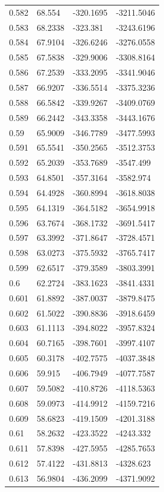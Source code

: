 \begin{tabular}{llll}
0.582 & 68.554 & -320.1695 & -3211.5046 \\
0.583 & 68.2338 & -323.381 & -3243.6196 \\
0.584 & 67.9104 & -326.6246 & -3276.0558 \\
0.585 & 67.5838 & -329.9006 & -3308.8164 \\
0.586 & 67.2539 & -333.2095 & -3341.9046 \\
0.587 & 66.9207 & -336.5514 & -3375.3236 \\
0.588 & 66.5842 & -339.9267 & -3409.0769 \\
0.589 & 66.2442 & -343.3358 & -3443.1676 \\
0.59 & 65.9009 & -346.7789 & -3477.5993 \\
0.591 & 65.5541 & -350.2565 & -3512.3753 \\
0.592 & 65.2039 & -353.7689 & -3547.499 \\
0.593 & 64.8501 & -357.3164 & -3582.974 \\
0.594 & 64.4928 & -360.8994 & -3618.8038 \\
0.595 & 64.1319 & -364.5182 & -3654.9918 \\
0.596 & 63.7674 & -368.1732 & -3691.5417 \\
0.597 & 63.3992 & -371.8647 & -3728.4571 \\
0.598 & 63.0273 & -375.5932 & -3765.7417 \\
0.599 & 62.6517 & -379.3589 & -3803.3991 \\
0.6 & 62.2724 & -383.1623 & -3841.4331 \\
0.601 & 61.8892 & -387.0037 & -3879.8475 \\
0.602 & 61.5022 & -390.8836 & -3918.6459 \\
0.603 & 61.1113 & -394.8022 & -3957.8324 \\
0.604 & 60.7165 & -398.7601 & -3997.4107 \\
0.605 & 60.3178 & -402.7575 & -4037.3848 \\
0.606 & 59.915 & -406.7949 & -4077.7587 \\
0.607 & 59.5082 & -410.8726 & -4118.5363 \\
0.608 & 59.0973 & -414.9912 & -4159.7216 \\
0.609 & 58.6823 & -419.1509 & -4201.3188 \\
0.61 & 58.2632 & -423.3522 & -4243.332 \\
0.611 & 57.8398 & -427.5955 & -4285.7653 \\
0.612 & 57.4122 & -431.8813 & -4328.623 \\
0.613 & 56.9804 & -436.2099 & -4371.9092 \\

\end{tabular}
